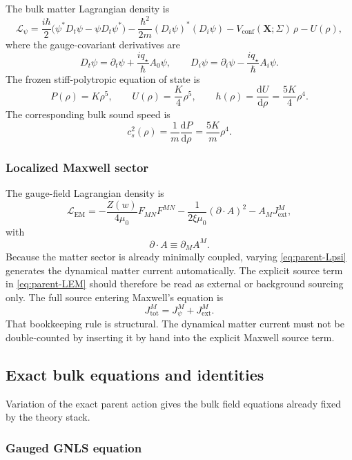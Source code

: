 \documentclass[11pt]{article}
\theoremstyle{definition}
\begin{document}
The bulk matter Lagrangian density is
\begin{equation}
\mathcal L_\psi
=
\frac{i\hbar}{2}\bigl(\psi^*D_t\psi-\psi D_t\psi^*\bigr)
-\frac{\hbar^2}{2m}(D_i\psi)^*(D_i\psi)
-V_{\mathrm{conf}}(\mathbf X;\Sigma)\,\rho
-U(\rho),
\label{eq:parent-Lpsi}
\end{equation}
where the gauge-covariant derivatives are
\[
D_t\psi=\partial_t\psi+\frac{i q_\star}{\hbar}A_0\psi,
\qquad
D_i\psi=\partial_i\psi-\frac{i q_\star}{\hbar}A_i\psi.
\]
The frozen stiff-polytropic equation of state is
\[
P(\rho)=K\rho^5,
\qquad
U(\rho)=\frac{K}{4}\rho^5,
\qquad
h(\rho)=\frac{\mathrm dU}{\mathrm d\rho}=\frac{5K}{4}\rho^4.
\]
The corresponding bulk sound speed is
\[
c_s^2(\rho)=\frac{1}{m}\frac{\mathrm dP}{\mathrm d\rho}=\frac{5K}{m}\rho^4.
\]

\subsubsection*{Localized Maxwell sector}

The gauge-field Lagrangian density is
\begin{equation}
\mathcal L_{\mathrm{EM}}
=
-\frac{Z(w)}{4\mu_0}F_{MN}F^{MN}
-\frac{1}{2\xi\mu_0}(\partial\!\cdot\!A)^2
-A_M J_{\mathrm{ext}}^M,
\label{eq:parent-LEM}
\end{equation}
with
\[
\partial\!\cdot\!A\equiv \partial_M A^M.
\]
Because the matter sector is already minimally coupled, varying \eqref{eq:parent-Lpsi} generates the dynamical matter current automatically. The explicit source term in \eqref{eq:parent-LEM} should therefore be read as external or background sourcing only. The full source entering Maxwell's equation is
\[
J_{\mathrm{tot}}^M=J_\psi^M+J_{\mathrm{ext}}^M.
\]
That bookkeeping rule is structural. The dynamical matter current must not be double-counted by inserting it by hand into the explicit Maxwell source term.

\subsection{Exact bulk equations and identities}

Variation of the exact parent action gives the bulk field equations already fixed by the theory stack.

\subsubsection*{Gauged GNLS equation}
\end{document}
